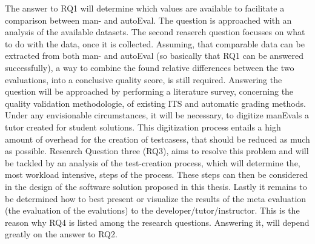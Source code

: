 The answer to RQ1 will determine which values are available to facilitate a comparison
between man- and autoEval. The question is approached with an analysis of the available
datasets.
The second reaserch question focusses on what to do with the data, once it is collected.
Assuming, that comparable data can be extracted from both man- and autoEval (so basically
that RQ1 can be answered successfully), a way to combine the found relative differences
between the two evaluations, into a conclusive quality score, is still required.
Answering the question will be approached by performing a literature survey, concerning the
quality validation methodologie, of existing ITS and automatic grading methods.
Under any envisionable circumstances, it will be necessary, to digitize manEvals a tutor
created for student solutions. This digitization process entails a high amount of overhead 
for the creation of testcasess, that should be reduced as much as possible. Research Question
three (RQ3), aims to resolve this problem and will be tackled by an analysis of the test-creation
process, which will determine the, most workload intensive, steps of the process. These steps 
can then be considered in the design of the software solution proposed in this thesis.
Lastly it remains to be determined how to best present or visualize the results of the meta 
evaluation (the evaluation of the evalutions) to the developer/tutor/instructor.
This is the reason why RQ4 is listed among the research questions. Answering it, will depend
greatly on the answer to RQ2.
